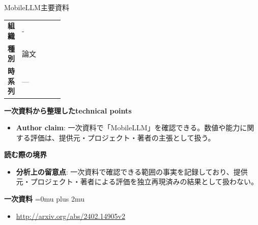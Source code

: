 \begin{technicalnote}{MobileLLM}{主要資料}
\begingroup
\begin{tabularx}{\linewidth}{@{}>{\bfseries}p{0.22\linewidth}X@{}}
組織 & - \\
種別 & 論文 \\
時系列 & — \\
\end{tabularx}
\smallskip
{\bfseries 一次資料から整理したtechnical points}
\begin{itemize}[leftmargin=1.5em,itemsep=0.35em]
\item \textbf{Author claim}: 一次資料で「MobileLLM」を確認できる。数値や能力に関する評価は、提供元・プロジェクト・著者の主張として扱う。
\end{itemize}
\begin{minipage}{\linewidth}
{\bfseries 読む際の境界}
\begin{itemize}[leftmargin=1.5em,itemsep=0.35em]
\item \textbf{分析上の留意点}: 一次資料で確認できる範囲の事実を記録しており、提供元・プロジェクト・著者による評価を独立再現済みの結果として扱わない。
\end{itemize}
\begin{samepage}
{\bfseries 一次資料}
\begingroup\sloppy
\Urlmuskip=0mu plus 2mu\relax
\begin{itemize}[leftmargin=1.5em,itemsep=0.25em]
\item {\scriptsize\url{http://arxiv.org/abs/2402.14905v2}}
\end{itemize}
\endgroup
\end{samepage}
\end{minipage}
\endgroup
\end{technicalnote}
\medskip

